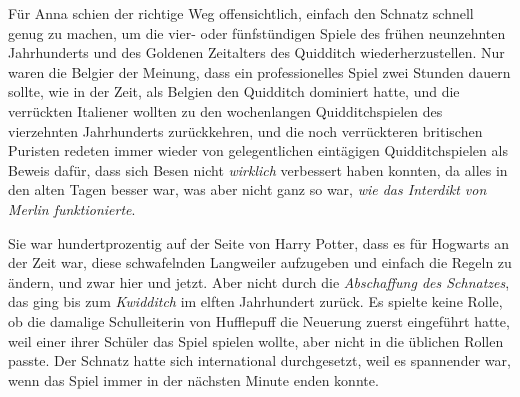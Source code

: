Für Anna schien der richtige Weg offensichtlich, einfach den Schnatz schnell genug zu machen, um die vier- oder fünfstündigen Spiele des frühen neunzehnten Jahrhunderts und des Goldenen Zeitalters des Quidditch wiederherzustellen. Nur waren die Belgier der Meinung, dass ein professionelles Spiel zwei Stunden dauern sollte, wie in der Zeit, als Belgien den Quidditch dominiert hatte, und die verrückten Italiener wollten zu den wochenlangen Quidditchspielen des vierzehnten Jahrhunderts zurückkehren, und die noch verrückteren britischen Puristen redeten immer wieder von gelegentlichen eintägigen Quidditchspielen als Beweis dafür, dass sich Besen nicht \emph{wirklich} verbessert haben konnten, da alles in den alten Tagen besser war, was aber nicht ganz so war, \emph{wie das Interdikt von Merlin funktionierte}.

Sie war hundertprozentig auf der Seite von Harry Potter, dass es für Hogwarts an der Zeit war, diese schwafelnden Langweiler aufzugeben und einfach die Regeln zu ändern, und zwar hier und jetzt. Aber nicht durch die \emph{Abschaffung des Schnatzes}, das ging bis zum \emph{Kwidditch} im elften Jahrhundert zurück. Es spielte keine Rolle, ob die damalige Schulleiterin von Hufflepuff die Neuerung zuerst eingeführt hatte, weil einer ihrer Schüler das Spiel spielen wollte, aber nicht in die üblichen Rollen passte.
Der Schnatz hatte sich international durchgesetzt, weil es spannender war, wenn das Spiel immer in der nächsten Minute enden konnte.

